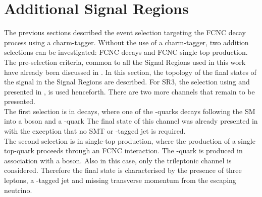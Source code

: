 \section{Additional Signal Regions}
\label{sec:selection_all}
The previous sections described the event selection targeting the FCNC \ttbar decay process using a charm-tagger. Without the use of a charm-tagger, two addition selections can be investigated: FCNC \ttbar decays and FCNC single top production.\\
The pre-selection criteria, common to all the Signal Regions used in this work have already been discussed in .
In this section, the topology of the final states of the signal in the Signal Regions are described. 
For SR3\tZc, the selection using \DLrc and presented in , is used henceforth.
There are two more channels that remain to be presented.
\vspace{\baselineskip}
\\The first selection is \FCNCtZc in \ttbar decays, where one of the \Pqt-quarks decays following the SM into a \PW boson and a
\Pqb-quark %
The final state of this channel was already presented in   with the exception that no SMT or \Pqc-tagged jet is required.
\vspace{\baselineskip}
\\The second selection is \FCNCtZc in single-top production, where the
production of a single top-quark proceeds through an FCNC
interaction. The \Pqt-quark is produced in association with a \PZ
boson. Also in this case, only the trileptonic channel is
considered. Therefore the final state is characterised by
the presence of three leptons, a \Pqb-tagged jet and missing
transverse momentum from the escaping neutrino. 

